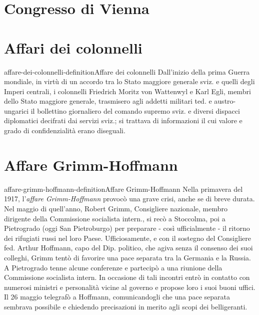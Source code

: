\documentclass[preview]{standalone}
\begin{document}
\section{Congresso di Vienna}


\section{Affari dei colonnelli}

\begin{snippetdefinition}{affare-dei-colonnelli-definition}{Affare dei colonnelli}
    Dall'inizio della prima Guerra mondiale,
    in virtù di un accordo tra lo Stato maggiore generale sviz.
    e quelli degli Imperi centrali, i colonnelli Friedrich Moritz von Wattenwyl e Karl Egli,
    membri dello Stato maggiore generale, trasmisero agli addetti militari ted. e austro-ungarici
    il bollettino giornaliero del comando supremo sviz. e diversi dispacci diplomatici decifrati
    dai servizi sviz.; si trattava di informazioni il cui valore e grado di confidenzialità
    erano diseguali.
\end{snippetdefinition}

\section{Affare Grimm-Hoffmann}

\begin{snippetdefinition}{affare-grimm-hoffmann-definition}{Affare Grimm-Hoffmann}
    Nella primavera del 1917,
    l'\textit{affare Grimm-Hoffmann} provocò una grave crisi,
    anche se di breve durata. Nel maggio di quell'anno, 
    Robert Grimm, Consigliere nazionale, membro dirigente della 
    Commissione socialista intern., si recò a Stoccolma, poi 
    a Pietrogrado (oggi San Pietroburgo) per preparare - così ufficialmente - 
    il ritorno dei rifugiati russi nel loro Paese. 
    Ufficiosamente, e con il sostegno del Consigliere fed. Arthur Hoffmann, 
    capo del Dip. politico, che agiva senza il consenso dei suoi colleghi, 
    Grimm tentò di favorire una pace separata tra la Germania e la Russia. 
    A Pietrogrado tenne alcune conferenze e partecipò a una riunione della Commissione
    socialista intern. In occasione di tali incontri entrò in contatto con numerosi
    ministri e personalità vicine al governo e propose loro i suoi buoni uffici.
    Il 26 maggio telegrafò a Hoffmann, comunicandogli che una pace separata
    sembrava possibile e chiedendo precisazioni in merito agli scopi dei belligeranti.
\end{snippetdefinition}
\end{document}
